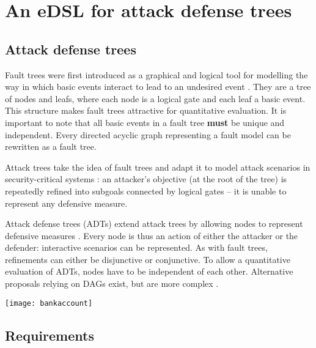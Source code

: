 \documentclass{scrreprt}
\begin{document}

\chapter{An eDSL for attack defense trees}

\section{Attack defense trees}

Fault trees were first introduced as a graphical and logical tool for modelling
the way in which basic events interact to lead to an undesired event
\cite[IV.1]{Vesely1981}. They are a tree of nodes and leafs, where each node is
a logical gate and each leaf a basic event. This structure makes fault trees
attractive for quantitative evaluation. It is important to note that all basic
events in a fault tree \textbf{must} be unique and independent. Every directed
acyclic graph representing a fault model can be rewritten as a fault tree.

Attack trees take the idea of fault trees and adapt it to model attack scenarios
in security-critical systems \cite{Schneier1999} \cite{Brooke2003}
\cite{NaiFovino2009}: an attacker's objective (at the root of the tree) is
repeatedly refined into subgoals connected by logical gates -- it is unable to
represent any defensive measure.

Attack defense trees (ADTs) extend attack trees by allowing nodes to represent
defensive measures \cite{Kordy}. Every node is thus an action of either the
attacker or the defender: interactive scenarios can be represented. As with
fault trees, refinements can either be disjunctive or conjunctive. To allow a
quantitative evaluation of ADTs, nodes have to be independent of each other.
Alternative proposals relying on DAGs exist, but are more complex
\cite{Kordy2013a}.

\texttt{[image: bankaccount]}



\section{Requirements}

\end{document}
